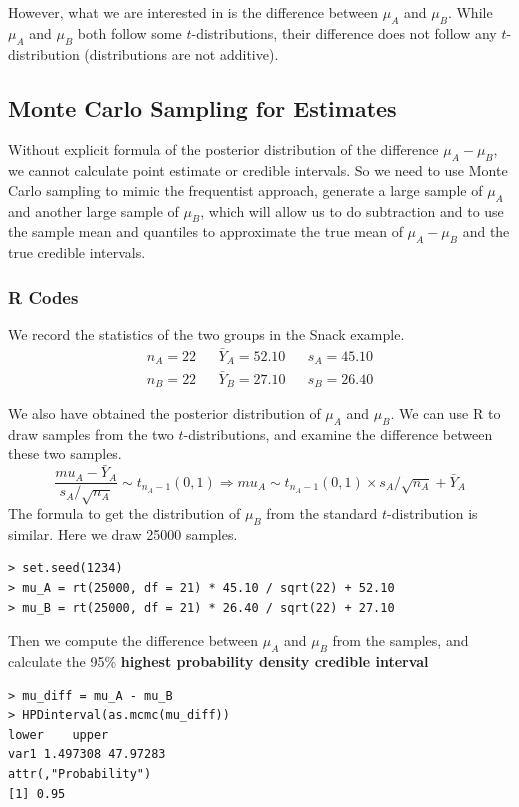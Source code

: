 \documentclass{article}
\begin{document}
However, what we are interested in is the difference between $\mu_A$ and $\mu_B$. While $\mu_A$ and $\mu_B$ both follow some $t$-distributions, their difference does not follow any $t$-distribution (distributions are not additive).

\subsection{Monte Carlo Sampling for Estimates}

Without explicit formula of the posterior distribution of the difference $\mu_A-\mu_B$, we cannot calculate point estimate or credible intervals. So we need to use Monte Carlo sampling to mimic the frequentist approach, generate a large sample of $\mu_A$ and another large sample of $\mu_B$, which will allow us to do subtraction and to use the sample mean and quantiles to approximate the true mean of $\mu_A-\mu_B$ and the true credible intervals.

\subsubsection*{R Codes}

We record the statistics of the two groups in the Snack example.
\begin{align*}
& n_A = 22 & & \bar{Y}_A = 52.10 &  & s_A = 45.10 & \\
& n_B = 22 &  & \bar{Y}_B = 27.10 & & s_B = 26.40
\end{align*}
 
We also have obtained the posterior distribution of $\mu_A$ and $\mu_B$. We can use R to draw samples from the two $t$-distributions, and examine the difference between these two samples.
$$ \frac{mu_A - \bar{Y}_A}{s_A/ \sqrt{n_A}} \sim t_{n_A-1}(0, 1) \Longrightarrow mu_A \sim t_{n_A - 1}(0, 1) \times s_A/\sqrt{n_A} + \bar{Y}_A $$
The formula to get the distribution of $\mu_B$ from the standard $t$-distribution is similar. Here we draw 25000 samples.

\begin{lstlisting}
> set.seed(1234)
> mu_A = rt(25000, df = 21) * 45.10 / sqrt(22) + 52.10
> mu_B = rt(25000, df = 21) * 26.40 / sqrt(22) + 27.10
\end{lstlisting}

Then we compute the difference between $\mu_A$ and $\mu_B$ from the samples, and calculate the 95\% \textbf{highest probability density credible interval}

\begin{lstlisting}
> mu_diff = mu_A - mu_B
> HPDinterval(as.mcmc(mu_diff))
lower    upper
var1 1.497308 47.97283
attr(,"Probability")
[1] 0.95
\end{lstlisting}
\end{document}
